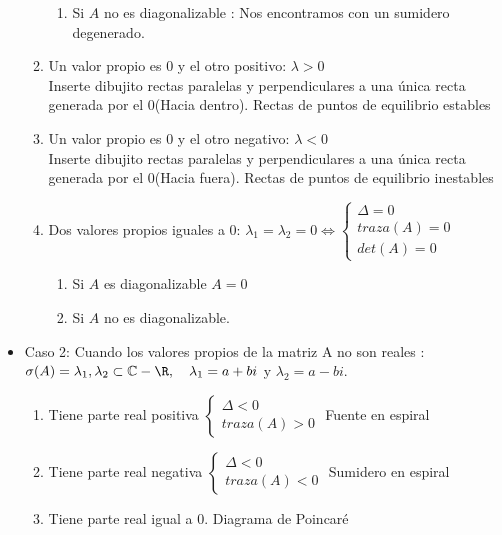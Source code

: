 \begin{itemize}
\begin{enumerate}
\begin{enumerate}
\item Si $A$ no es diagonalizable : Nos encontramos con un sumidero degenerado.
\end{enumerate}
\item Un valor propio es 0 y el otro positivo: $\lambda>0$ \\
Inserte dibujito rectas paralelas y perpendiculares a una única recta generada por el 0(Hacia dentro). Rectas  de puntos de equilibrio estables
\item Un valor propio es 0 y el otro negativo: $\lambda<0 $ \\
Inserte dibujito rectas paralelas y perpendiculares a una única recta generada por el 0(Hacia fuera). Rectas  de puntos de equilibrio inestables
\item Dos valores propios iguales a 0: $\lambda_1=\lambda_2=0 \Leftrightarrow \left\{ \begin{array}{ll}\Delta=0 \\ traza(A)=0 \\ det(A)=0\end{array}\right.$
\begin{enumerate}
\item Si $A$ es diagonalizable $A=0$
\item Si $A$ no es diagonalizable.
\end{enumerate}
\end{enumerate}
\item Caso 2: Cuando los valores propios de la matriz A no son reales : $\sigma(A)={\lambda_1,\lambda_2}\subset \mathbb{C} - \R, \quad \lambda_1=a+bi$ y $ \lambda_2=a-bi$.
\begin{enumerate}
\item Tiene parte real positiva $\left\{\begin{array}{ll} \Delta < 0 \\ traza(A) > 0 \end{array}\right.$ Fuente en espiral
\item Tiene parte real negativa $\left\{\begin{array}{ll} \Delta < 0 \\ traza(A) < 0 \end{array}\right.$ Sumidero en espiral
\item Tiene parte real igual a 0. Diagrama de Poincaré
\end{enumerate}
\end{itemize}
